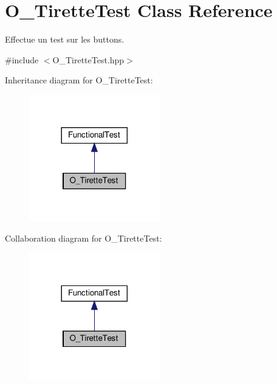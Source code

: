 \hypertarget{classO__TiretteTest}{}\section{O\+\_\+\+Tirette\+Test Class Reference}
\label{classO__TiretteTest}


Effectue un test sur les buttons.  




{\ttfamily \#include $<$O\+\_\+\+Tirette\+Test.\+hpp$>$}



Inheritance diagram for O\+\_\+\+Tirette\+Test\+:
\nopagebreak
\begin{figure}[H]
\begin{center}
\leavevmode
\includegraphics[width=161pt]{classO__TiretteTest__inherit__graph}
\end{center}
\end{figure}


Collaboration diagram for O\+\_\+\+Tirette\+Test\+:
\nopagebreak
\begin{figure}[H]
\begin{center}
\leavevmode
\includegraphics[width=161pt]{classO__TiretteTest__coll__graph}
\end{center}
\end{figure}
